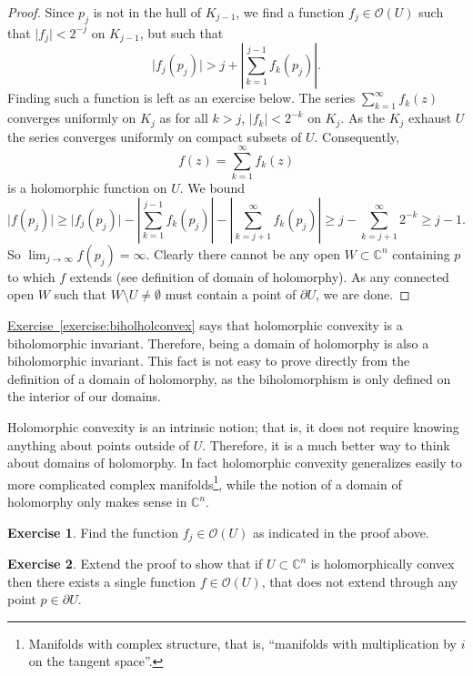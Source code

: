 \documentclass[12pt,openany]{book}
\newcommand{\sabs}[1]{\lvert {#1} \rvert}
\newcommand{\abs}[1]{\left\lvert {#1} \right\rvert}
\newcommand{\C}{{\mathbb{C}}}
\newcommand{\sO}{{\mathcal{O}}}
\theoremstyle{plain}
\theoremstyle{remark}
\theoremstyle{definition}
\newenvironment{exbox}{%
    \def\FrameCommand{\vrule width 1pt \relax\hspace {10pt}}%
    \MakeFramed {\advance \hsize -\width \FrameRestore }%
}{%
    \endMakeFramed
}
\theoremstyle{exercise}
\newtheorem{exercise}{Exercise}[section]
\theoremstyle{example}
\newcommand{\exerciseref}[1]{\hyperref[#1]{Exercise~\ref*{#1}}}
\begin{document}
\begin{proof}
Since $p_j$ is not in the hull of $K_{j-1}$, we find a function $f_j \in
\sO(U)$ such that $\sabs{f_j} < 2^{-j}$ on $K_{j-1}$, but such that
\begin{equation*}
\sabs{f_j(p_j)} > j + \abs{\sum_{k=1}^{j-1} f_k(p_j)} .
\end{equation*}
Finding such a function is left as an exercise below.
The series $\sum_{k=1}^\infty f_k(z)$ converges uniformly on $K_j$
as for all $k > j$, $\sabs{f_k} < 2^{-k}$ on $K_j$.
As the $K_j$ exhaust $U$ the series converges uniformly on compact
subsets of $U$.  Consequently,
\begin{equation*}
f(z) = \sum_{k=1}^\infty f_k(z)
\end{equation*}
is a holomorphic function on $U$.  We bound
\begin{equation*}
\sabs{f(p_j)} \geq
\sabs{f_j(p_j)}
-
\abs{\sum_{k=1}^{j-1} f_k(p_j)}
-
\abs{\sum_{k=j+1}^\infty f_k(p_j)}
\geq
j
-
\sum_{k=j+1}^\infty 2^{-k}
\geq j-1 .
\end{equation*}
So $\lim_{j\to\infty} f(p_j) = \infty$.
Clearly there cannot be any open $W \subset \C^n$
containing $p$ to which $f$ extends (see definition of domain of holomorphy).  As any
connected open $W$ such that $W \setminus U \not= \emptyset$ must contain a
point of $\partial U$, we are done.
\end{proof}

\exerciseref{exercise:biholholconvex}
says that holomorphic convexity is a biholomorphic invariant.
Therefore,
being a domain of holomorphy is also a biholomorphic invariant.  This
fact is not easy to prove directly from the definition of a domain of
holomorphy, as the
biholomorphism is only defined on the interior of our domains.

Holomorphic convexity is an intrinsic notion; that is, it does not require
knowing anything about points outside of $U$.  Therefore, it is a much
better way to think about domains of holomorphy.  In fact holomorphic
convexity generalizes easily to more complicated complex
manifolds\footnote{Manifolds with complex structure, that is, ``manifolds
with multiplication by $i$ on the tangent space''.}, while
the notion of a domain of holomorphy only makes sense in $\C^n$.

\begin{exbox}
\begin{exercise}
Find the function $f_j \in \sO(U)$ as indicated in the proof above.
\end{exercise}

\begin{exercise}
Extend the proof to show that if $U \subset \C^n$
is holomorphically convex then there
exists a single function $f \in \sO(U)$, that does not extend through any
point $p \in \partial U$.
\end{exercise}
\end{exbox}
\end{document}
